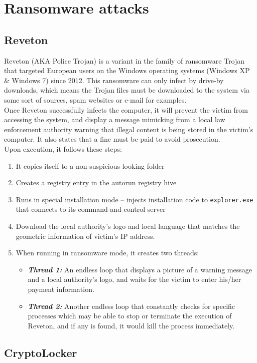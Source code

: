 \documentclass[10pt]{article}
\begin{document}
\section{Ransomware attacks}
\subsection{Reveton}
Reveton (AKA Police Trojan) is a variant in the family of ransomware Trojan that targeted European users on the Windows operating systems (Windows XP \& Windows 7) since 2012. This ransomware can only infect by drive-by downloads, which means the Trojan files must be downloaded to the system via some sort of sources, spam websites or e-mail for examples. \\
Once Reveton successfully infects the computer, it will prevent the victim from accessing the system, and display a message mimicking from a local law enforcement authority warning that illegal content is being stored in the victim’s computer. It also states that a fine must be paid to avoid prosecution.\\
Upon execution, it follows these steps:
\begin{enumerate}
\item It copies itself to a non-suspicious-looking folder 
\item Creates a registry entry in the autorun registry hive
\item Runs in special installation mode – injects installation code to \texttt{explorer.exe} that connects to its command-and-control server
\item Download the local authority’s logo and local language that matches the geometric information of victim’s IP address. 
\item When running in ransomware mode, it creates two threads:
\begin{itemize}
\item \textbf{\textit{Thread 1: }}An endless loop that displays a picture of a warning message and a local authority’s logo, and waits for the victim to enter his/her payment information.
\item \textbf{\textit{Thread 2: }}Another endless loop that constantly checks for specific processes which may be able to stop or terminate the execution of Reveton, and if any is found, it would kill the process immediately.
\end{itemize}
\end{enumerate}
\subsection{CryptoLocker}
\end{document}

